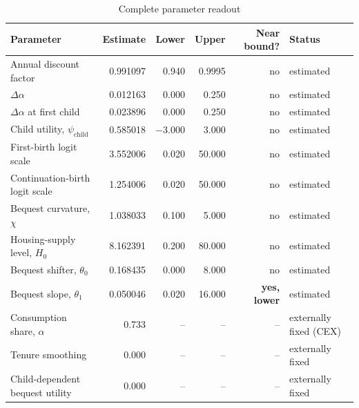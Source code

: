 \documentclass[11pt]{article}
\begin{document}
\begin{table}[ht!]
\centering
\caption{Complete parameter readout}
\scriptsize
\setlength{\tabcolsep}{4pt}
\begin{tabularx}{\textwidth}{Yrrrrl}
\toprule
Parameter & Estimate & Lower & Upper & Near bound? & Status\\
\midrule
Annual discount factor & 0.991097 & 0.940 & 0.9995 & no & estimated\\
$\Delta\alpha$ & 0.012163 & 0.000 & 0.250 & no & estimated\\
$\Delta\alpha$ at first child & 0.023896 & 0.000 & 0.250 & no & estimated\\
Child utility, $\psi_{\mathrm{child}}$ & 0.585018 & $-3.000$ & 3.000 & no & estimated\\
First-birth logit scale & 3.552006 & 0.020 & 50.000 & no & estimated\\
Continuation-birth logit scale & 1.254006 & 0.020 & 50.000 & no & estimated\\
Bequest curvature, $\chi$ & 1.038033 & 0.100 & 5.000 & no & estimated\\
Housing-supply level, $H_0$ & 8.162391 & 0.200 & 80.000 & no & estimated\\
Bequest shifter, $\theta_0$ & 0.168435 & 0.000 & 8.000 & no & estimated\\
Bequest slope, $\theta_1$ & 0.050046 & 0.020 & 16.000 & \textbf{yes, lower} & estimated\\
Consumption share, $\alpha$ & 0.733 & -- & -- & -- & externally fixed (CEX)\\
Tenure smoothing & 0.000 & -- & -- & -- & externally fixed\\
Child-dependent bequest utility & 0.000 & -- & -- & -- & externally fixed\\
\bottomrule
\end{tabularx}
\end{table}
\end{document}
